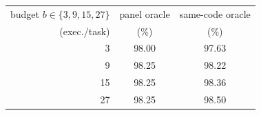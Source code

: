 \begin{tabular}{@{}rcc@{}}
\toprule
budget $b \in \{3,9,15,27\}$ & panel oracle & same-code oracle \\
(exec./task) & (\%) & (\%) \\
\midrule
3 & 98.00 & 97.63 \\
9 & 98.25 & 98.22 \\
15 & 98.25 & 98.36 \\
27 & 98.25 & 98.50 \\
\bottomrule
\end{tabular}
